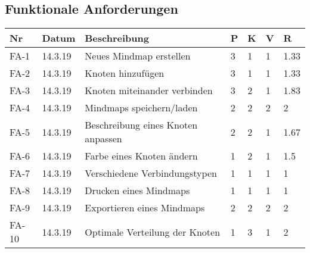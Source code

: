 \documentclass[a4paper,parskip]{scrartcl}
\begin{document}
\subsection{Funktionale Anforderungen}
\begin{table}[h]

\begin{tabular}{|l|l|l|l|l|l|l|}

\hline
Nr  & Datum   & Beschreibung                        & P & K & V & R \\ \hline
FA-1 & 14.3.19 & Neues Mindmap erstellen             & 3 & 1 & 1 & \cellcolor{green!20}1.33 \\\hline
FA-2 & 14.3.19 & Knoten hinzufügen                   & 3 & 1 & 1 & \cellcolor{green!20}1.33 \\\hline
FA-3 & 14.3.19 & Knoten miteinander verbinden        & 3 & 2 & 1 & \cellcolor{yellow!20}1.83 \\\hline
FA-4 & 14.3.19 & Mindmaps speichern/laden            & 2 & 2 & 2 & \cellcolor{yellow!20}2 \\\hline
FA-5 & 14.3.19 & Beschreibung eines Knoten anpassen  & 2 & 2 & 1 & \cellcolor{yellow!20}1.67 \\\hline
FA-6 & 14.3.19 & Farbe eines Knoten ändern           & 1 & 2 & 1 & \cellcolor{yellow!20}1.5 \\\hline
FA-7 & 14.3.19 & Verschiedene Verbindungstypen       & 1 & 1 & 1 & \cellcolor{green!20}1 \\\hline
FA-8 & 14.3.19 & Drucken eines Mindmaps              & 1 & 1 & 1 & \cellcolor{green!20}1 \\\hline
FA-9 & 14.3.19 & Exportieren eines Mindmaps          & 2 & 2 & 2 & \cellcolor{yellow!20}2 \\\hline
FA-10 & 14.3.19 & Optimale Verteilung der Knoten     & 1 & 3 & 1 & \cellcolor{yellow!20}2 \\\hline

\end{tabular}

\end{table}
\end{document}
